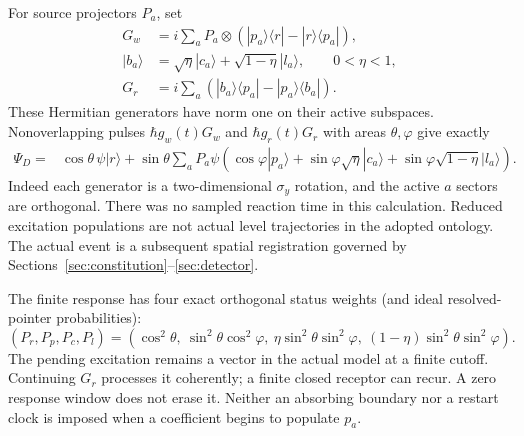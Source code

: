 \documentclass[11pt]{article}
\theoremstyle{definition}\newtheorem{assumption}[theorem]{Constitutive assumption}
\theoremstyle{remark}\newtheorem{remark}[theorem]{Remark}
\newcommand{\ket}[1]{|#1\rangle}\newcommand{\bra}[1]{\langle#1|}
\begin{document}
For source projectors $P_a$, set
\begin{align}\label{eq:reactionG}
 G_w&=i\sum_aP_a\otimes(\ket{p_a}\bra r-\ket r\bra{p_a}),\\
 \ket{b_a}&=\sqrt\eta\ket{c_a}+\sqrt{1-\eta}\ket{l_a},\qquad 0<\eta<1,\nonumber\\
 G_r&=i\sum_a(\ket{b_a}\bra{p_a}-\ket{p_a}\bra{b_a}).\nonumber
\end{align}
These Hermitian generators have norm one on their active subspaces. Nonoverlapping pulses $\hbar g_w(t)G_w$ and $\hbar g_r(t)G_r$ with areas $\theta,\varphi$ give exactly
\begin{equation}\label{eq:resourcewave}
 \begin{split}
 \Psi_D={}&\cos\theta\,\psi\ket r+\sin\theta\sum_aP_a\psi
 \left(\cos\varphi\ket{p_a}+\sin\varphi\sqrt\eta\ket{c_a}
                    +\sin\varphi\sqrt{1-\eta}\ket{l_a}\right).
 \end{split}
\end{equation}
Indeed each generator is a two-dimensional $\sigma_y$ rotation, and the active $a$ sectors are orthogonal. There was no sampled reaction time in this calculation. Reduced excitation populations are not actual level trajectories in the adopted ontology. The actual event is a subsequent spatial registration governed by Sections~\ref{sec:constitution}--\ref{sec:detector}.

The finite response has four exact orthogonal status weights (and ideal resolved-pointer probabilities):
\begin{equation}\label{eq:statuses}
 (P_r,P_p,P_c,P_l)=
 (\cos^2\theta,\ \sin^2\theta\cos^2\varphi,\
 \eta\sin^2\theta\sin^2\varphi,\ (1-\eta)\sin^2\theta\sin^2\varphi).
\end{equation}
The pending excitation remains a vector in the actual model at a finite cutoff. Continuing $G_r$ processes it coherently; a finite closed receptor can recur. A zero response window does not erase it. Neither an absorbing boundary nor a restart clock is imposed when a coefficient begins to populate $p_a$.
\end{document}
